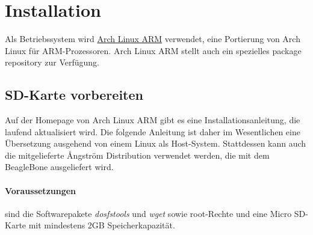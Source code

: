 \documentclass[manual.tex]{subfiles}
\begin{document}
\section{Installation}
Als Betriebssystem wird \href{http://archlinuxarm.org/}{Arch Linux ARM} verwendet, eine Portierung von Arch Linux für ARM-Prozessoren. Arch Linux ARM stellt auch ein spezielles package repository zur Verfügung.

\subsection{SD-Karte vorbereiten}
Auf der Homepage von Arch Linux ARM gibt es eine Installationsanleitung, die laufend aktualisiert wird. Die folgende Anleitung ist daher im Wesentlichen eine Übersetzung ausgehend von einem Linux als Host-System. Stattdessen kann auch die mitgelieferte {\AA}ngström Distribution verwendet werden, die mit dem BeagleBone ausgeliefert wird.

\paragraph{Voraussetzungen} sind die Softwarepakete \textit{dosfstools} und \textit{wget} sowie root-Rechte und eine Micro SD-Karte mit mindestens 2GB Speicherkapazität.
\end{document}
